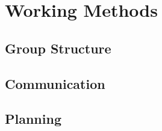 \chapter{Working Methods}

\section{Group Structure}


\section{Communication}


\section{Planning}

